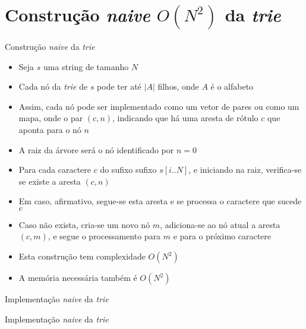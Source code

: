 \section{Construção {\it naive} $O(N^2)$ da {\it trie}}

\begin{frame}[fragile]{Construção {\it naive} da {\it trie}}

    \begin{itemize}
        \item Seja $s$ uma string de tamanho $N$

        \item Cada nó da {\it trie} de $s$ pode ter até $|A|$ filhos, onde $A$ é o alfabeto

        \item Assim, cada nó pode ser implementado como um vetor de pares ou como um mapa,
            onde o par $(c, n)$, indicando que há uma aresta de rótulo $c$ que aponta para o
            nó $n$

        \item A raiz da árvore será o nó identificado por $n = 0$

        \item Para cada caractere $c$ do sufixo sufixo $s[i..N]$, e iniciando na raiz,
            verifica-se se existe a aresta $(c, n)$

        \item Em caso, afirmativo, segue-se esta aresta e se processa o caractere que sucede $c$

        \item Caso não exista, cria-se um novo nó $m$, adiciona-se ao nó atual a aresta
            $(c, m)$, e segue o processamento para $m$ e para o próximo caractere
    
        \item Esta construção tem complexidade $O(N^2)$

        \item A memória necessária também é $O(N^2)$
    \end{itemize}

\end{frame}

\begin{frame}[fragile]{Implementação {\it naive} da {\it trie}}
\end{frame}

\begin{frame}[fragile]{Implementação {\it naive} da {\it trie}}
\end{frame}

